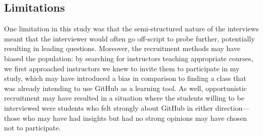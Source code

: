 \subsection{Limitations}
One limitation in this study was that the semi-structured nature of the interviews meant that the interviewer would often go off-script to probe further, potentially resulting in leading questions. Moreover, the recruitment methods may have biased the population: by searching for instructors teaching appropriate courses, we first approached instructors we knew to invite them to participate in my study, which may have introduced a bias in comparison to finding a class that was already intending to use GitHub as a learning tool. As well, opportunistic recruitment may have resulted in a situation where the students willing to be interviewed were students who felt strongly about GitHub in either direction---those who may have had insights but had no strong opinions may have chosen not to participate.





